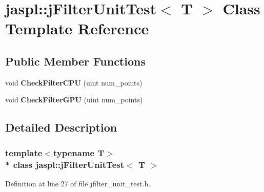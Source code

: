 \hypertarget{classjaspl_1_1j_filter_unit_test}{}\section{jaspl\+:\+:j\+Filter\+Unit\+Test$<$ T $>$ Class Template Reference}
\label{classjaspl_1_1j_filter_unit_test}
\subsection*{Public Member Functions}
\begin{DoxyCompactItemize}
\item 
void {\bfseries Check\+Filter\+C\+PU} (uint num\+\_\+points)\hypertarget{classjaspl_1_1j_filter_unit_test_ad7d58b5daf92be1e51afacdb3c04419d}{}\label{classjaspl_1_1j_filter_unit_test_ad7d58b5daf92be1e51afacdb3c04419d}

\item 
void {\bfseries Check\+Filter\+G\+PU} (uint num\+\_\+points)\hypertarget{classjaspl_1_1j_filter_unit_test_a875d01230ae647f7615c96065ab41779}{}\label{classjaspl_1_1j_filter_unit_test_a875d01230ae647f7615c96065ab41779}

\end{DoxyCompactItemize}


\subsection{Detailed Description}
\subsubsection*{template$<$typename T$>$\\*
class jaspl\+::j\+Filter\+Unit\+Test$<$ T $>$}



Definition at line 27 of file jfilter\+\_\+unit\+\_\+test.\+h.

